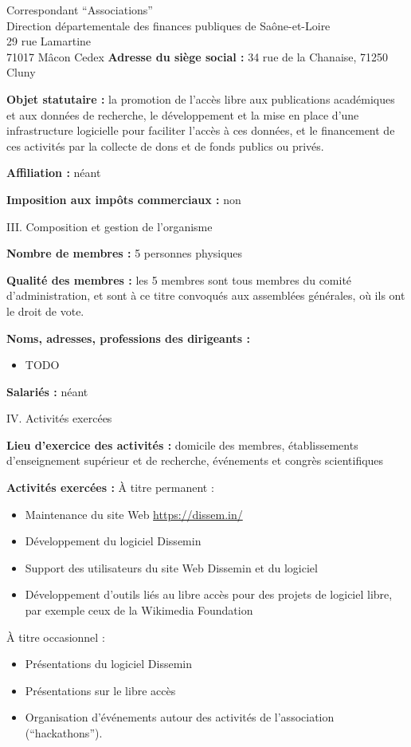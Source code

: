 \documentclass[11pt]{lettre}
\begin{document}
\begin{letter}{Correspondant ``Associations''\\Direction départementale des finances publiques de Saône-et-Loire\\29 rue Lamartine\\71017 Mâcon Cedex}
  \textbf{Adresse du siège social :} 34 rue de la Chanaise, 71250 Cluny

  \textbf{Objet statutaire :} la promotion de l'accès libre aux publications académiques
  et aux données de recherche, le développement et la mise en place d'une
  infrastructure logicielle pour faciliter l'accès à ces données, et le
  financement de ces activités par la collecte de dons et de fonds publics ou
  privés.

  \textbf{Affiliation :} néant

  \textbf{Imposition aux impôts commerciaux :} non

  \bigskip
  {\Large III. Composition et gestion de l'organisme }

  \textbf{Nombre de membres :} 5 personnes physiques

  \textbf{Qualité des membres :} les 5 membres sont tous membres du comité
  d'administration, et sont à ce titre convoqués aux assemblées générales, où
  ils ont le droit de vote.

  \textbf{Noms, adresses, professions des dirigeants :}
  \begin{itemize}
    \item TODO
  \end{itemize}

  \textbf{Salariés :} néant

  \bigskip
  {\Large IV. Activités exercées}

  \textbf{Lieu d'exercice des activités :} domicile des membres, établissements
  d'enseignement supérieur et de recherche, événements et congrès scientifiques

  \textbf{Activités exercées :} À titre permanent :

  \begin{itemize}
    \item Maintenance du site Web \url{https://dissem.in/}
    \item Développement du logiciel Dissemin
    \item Support des utilisateurs du site Web Dissemin et du logiciel
    \item Développement d'outils liés au libre accès pour des projets de
      logiciel libre, par exemple ceux de la Wikimedia Foundation
  \end{itemize}

  À titre occasionnel :

  \begin{itemize}
    \item Présentations du logiciel Dissemin
    \item Présentations sur le libre accès
    \item Organisation d'événements autour des activités de l'association
      (``hackathons'').
  \end{itemize}


\end{letter}
\end{document}
